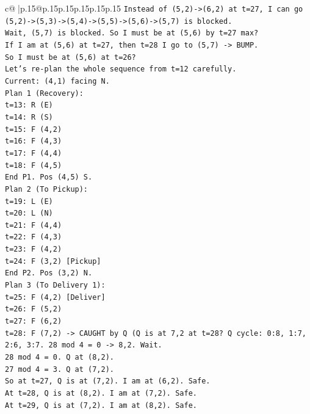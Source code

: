 \documentclass{article}
\begin{document}
{\begin{supertabular}{c@{$\;$}|p{.15\linewidth}@{}p{.15\linewidth}p{.15\linewidth}p{.15\linewidth}p{.15\linewidth}p{.15\linewidth}}
{{{\texttt{Instead of (5,2){-}>(6,2) at t=27, I can go (5,2){-}>(5,3){-}>(5,4){-}>(5,5){-}>(5,6){-}>(5,7) is blocked.} \\
\texttt{Wait, (5,7) is blocked. So I must be at (5,6) by t=27 max?} \\
\texttt{If I am at (5,6) at t=27, then t=28 I go to (5,7) {-}> BUMP.} \\
\texttt{So I must be at (5,6) at t=26?} \\
\texttt{Let's re{-}plan the whole sequence from t=12 carefully.} \\
\texttt{Current: (4,1) facing N.} \\
\texttt{Plan 1 (Recovery):} \\
\texttt{t=13: R (E)} \\
\texttt{t=14: R (S)} \\
\texttt{t=15: F (4,2)} \\
\texttt{t=16: F (4,3)} \\
\texttt{t=17: F (4,4)} \\
\texttt{t=18: F (4,5)} \\
\texttt{End P1. Pos (4,5) S.} \\
\texttt{Plan 2 (To Pickup):} \\
\texttt{t=19: L (E)} \\
\texttt{t=20: L (N)} \\
\texttt{t=21: F (4,4)} \\
\texttt{t=22: F (4,3)} \\
\texttt{t=23: F (4,2)} \\
\texttt{t=24: F (3,2) {[}Pickup{]}} \\
\texttt{End P2. Pos (3,2) N.} \\
\texttt{Plan 3 (To Delivery 1):} \\
\texttt{t=25: F (4,2) {[}Deliver{]}} \\
\texttt{t=26: F (5,2)} \\
\texttt{t=27: F (6,2)} \\
\texttt{t=28: F (7,2) {-}> CAUGHT by Q (Q is at 7,2 at t=28? Q cycle: 0:8, 1:7, 2:6, 3:7. 28 mod 4 = 0 {-}> 8,2. Wait.} \\
\texttt{28 mod 4 = 0. Q at (8,2).} \\
\texttt{27 mod 4 = 3. Q at (7,2).} \\
\texttt{So at t=27, Q is at (7,2). I am at (6,2). Safe.} \\
\texttt{At t=28, Q is at (8,2). I am at (7,2). Safe.} \\
\texttt{At t=29, Q is at (7,2). I am at (8,2). Safe.} \\
}}}
\end{supertabular}}
\end{document}
